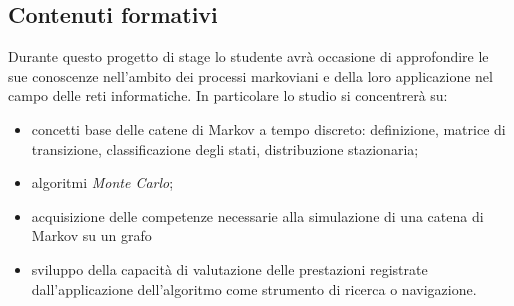 \subsection{Contenuti formativi}
Durante questo progetto di stage lo studente avrà occasione di approfondire le sue conoscenze nell'ambito dei processi markoviani e della loro applicazione nel campo delle reti informatiche.
	\newline
	In particolare lo studio si concentrerà su:
	\begin{itemize}
		\item concetti base delle catene di Markov a tempo discreto: definizione, matrice di transizione, classificazione degli stati, distribuzione stazionaria;
		\item algoritmi \textit{Monte Carlo};
		\item acquisizione delle competenze necessarie alla simulazione di una catena di Markov su un grafo
		\item sviluppo della capacità di valutazione delle prestazioni registrate dall'applicazione dell'algoritmo come strumento di ricerca o navigazione.
	\end{itemize}
